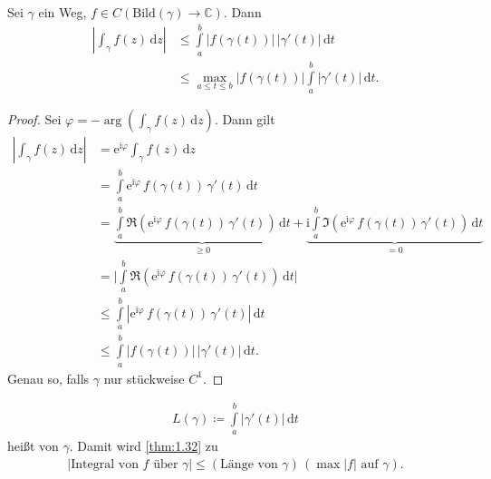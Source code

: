 \begin{theorem}[Satz] \label{thm:1.32}
  Sei $\gamma$ ein Weg, $f \in C(\mathrm{Bild}(\gamma) \to \mathbb{C})$. Dann
  \begin{align*}
    \left| \int_\gamma f(z) \, \mathrm{d}z \right| 
    &\leq \int\limits_{a}^{b} \left| f(\gamma(t)) \right| \, \left| \gamma'(t) \right| \, \mathrm{d}t \\
    &\leq \max\limits_{a \leq t \leq b} \left| f(\gamma(t)) \right| \int\limits_{a}^{b} \left| \gamma'(t) \right| \, \mathrm{d}t.
  \end{align*}
  
  \begin{proof} Sei $\varphi = - \arg \left( \int_\gamma f(z) \, \mathrm{d}z \right)$.
    Dann gilt
    \begin{align*}
      \left| \int_\gamma f(z) \, \mathrm{d}z \right| &= \mathrm{e}^{\mathrm{i} \varphi} \int_\gamma f(z) \, \mathrm{d}z \\
      &= \int\limits_{a}^{b} \mathrm{e}^{\mathrm{i} \varphi} \, f(\gamma(t)) \, \gamma'(t) \, \mathrm{d}t \\
      &= \underbrace{\int\limits_{a}^{b} \Re \left( \mathrm{e}^{\mathrm{i} \varphi} \, f(\gamma(t)) \, \gamma'(t) \right) \, \mathrm{d}t}_{\ge 0}
        + \underbrace{\mathrm{i} \int\limits_{a}^{b} \Im \left( \mathrm{e}^{\mathrm{i} \varphi} \, f(\gamma(t)) \, \gamma'(t) \right) \, \mathrm{d}t}_{=0} \\
      &= \bigg| \int\limits_{a}^{b} \Re \left( \mathrm{e}^{\mathrm{i} \varphi} \, f(\gamma(t)) \, \gamma'(t) \right) \, \mathrm{d}t \bigg| \\
      &\leq \int\limits_{a}^{b} \left| \mathrm{e}^{\mathrm{i} \varphi} \, f(\gamma(t)) \, \gamma'(t) \right| \, \mathrm{d}t \\
      &\leq \int\limits_{a}^{b} \left| f(\gamma(t)) \right| \, \left| \gamma'(t) \right| \, \mathrm{d}t.
    \end{align*}
    Genau so, falls $\gamma$ nur stückweise $C^1$.
  \end{proof}
\end{theorem}

\begin{theorem}[Definition]
  \begin{align*}
    L(\gamma) \coloneq \int\limits_{a}^{b} \left| \gamma'(t) \right| \, \mathrm{d}t
  \end{align*}
  heißt  von $\gamma$. Damit wird \ref{thm:1.32} zu
  \begin{align*}
    \left| \text{Integral von $f$ über $\gamma$} \right| \leq \left( \text{Länge von $\gamma$} \right) \, \left( \text{$\max |f|$ auf $\gamma$} \right).
  \end{align*}
\end{theorem}

